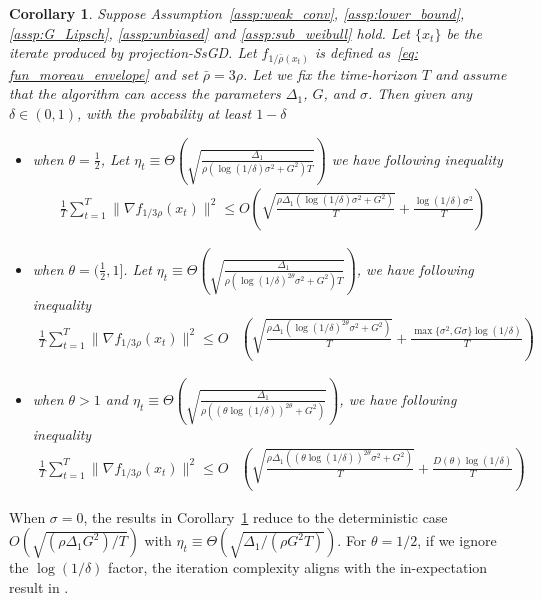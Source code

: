 \documentclass{article}
\newtheorem{corollary}{Corollary}
\begin{document}
\begin{corollary}\label{coro: fix_step_SsGD_subweibull}
     Suppose Assumption~\ref{assp:weak_conv}, \ref{assp:lower_bound}, \ref{assp:G_Lipsch}, \ref{assp:unbiased} and \ref{assp:sub_weibull} hold. Let $\{x_t\}$ be the iterate produced by projection-SsGD. Let $f_{1/\bar{\rho}(x_t)}$ is defined as~\eqref{eq: fun_moreau_envelope} and set $\bar{\rho}=3\rho$. Let we fix the time-horizon $T$ and assume that the algorithm can access the parameters $\Delta_1$, $G$, and $\sigma$. Then given any $\delta\in(0,1)$, with the probability at least $1-\delta$
    \begin{itemize}
        \item when $\theta=\frac{1}{2}$, Let $\eta_t\equiv \Theta\left(\sqrt{\frac{\Delta_1}{\rho(\log(1/\delta)\sigma^2+G^2)T}}\right)$ we have following inequality
            \begin{align}
                \frac{1}{T}\sum_{t=1}^T\|\nabla f_{1/3\rho}(x_t)\|^2\leq O\left(\sqrt{\frac{\rho\Delta_1(\log(1/\delta)\sigma^2+G^2)}{T}}+\frac{\log(1/\delta)\sigma^2}{T}\right) 
            \end{align}
        \item when $\theta =(\frac{1}{2},1]$. Let $\eta_t \equiv \Theta\left(\sqrt{\frac{\Delta_1}{\rho(\log(1/\delta)^{2\theta}\sigma^2+G^2)T}}\right)$, we have following inequality 
        \begin{align}
            \frac{1}{T}\sum_{t=1}^T \|\nabla f_{1/3\rho}(x_t)\|^2\leq O&\left(\sqrt{\frac{\rho\Delta_1(\log(1/\delta)^{2\theta}\sigma^2+G^2)}{T}}+\frac{\max\{\sigma^2,G\sigma\}\log(1/\delta)}{T}\right)
        \end{align}
        \item when $\theta>1$ and $\eta_t \equiv  \Theta\left(\sqrt{\frac{\Delta_1}{\rho((\theta\log(1/\delta))^{2\theta}+G^2)}}\right)$, we have following inequality
        \begin{align}
            \frac{1}{T}\sum_{t=1}^T \|\nabla f_{1/3\rho}(x_t)\|^2\leq O&\left(\sqrt{\frac{\rho\Delta_1((\theta\log(1/\delta))^{2\theta}\sigma^2+G^2)}{T}}+\frac{D(\theta)\log(1/\delta)}{T}\right)
        \end{align}
    \end{itemize}
\end{corollary}

When $\sigma = 0$, the results in Corollary~\ref{coro: fix_step_SsGD_subweibull} reduce to the deterministic case $O(\sqrt{(\rho\Delta_1 G^2)/T})$ with $\eta_t \equiv \Theta(\sqrt{\Delta_1/(\rho G^2T)})$. For $\theta = 1/2$, if we ignore the $\log(1/\delta)$ factor, the iteration complexity aligns with the in-expectation result in \citep{Davis_2018}.
\end{document}
